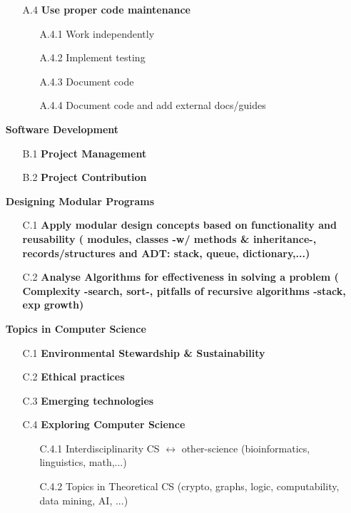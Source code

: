 \documentclass{report}
\begin{document}
\begin{enumerate}
\begin{enumerate}
\begin{enumerate}
		\end{enumerate}
	\item[A.4] {\bf Use proper code maintenance }
		\begin{enumerate}
		\item[A.4.1] Work independently
		\item[A.4.2] Implement testing
		\item[A.4.3] Document code
		\item[A.4.4] Document code and add external docs/guides
		\end{enumerate}
	\end{enumerate}
\item[\xpecB{B.}] {\bf Software Development }
	\begin{enumerate}
	\item[B.1] {\bf Project Management }
	\item[B.2] {\bf Project Contribution }
	\end{enumerate}
\item[\xpecC{C.}] {\bf Designing Modular Programs }
	\begin{enumerate}
	\item[C.1] {\bf Apply modular design concepts based on functionality and reusability ( modules, classes -w/ methods \& inheritance-, records/structures and ADT: stack, queue, dictionary,...) }
	\item[C.2] {\bf Analyse Algorithms for effectiveness in solving a problem ( Complexity -search, sort-, pitfalls of recursive algorithms -stack, exp growth) }
	\end{enumerate}
\item[\xpecD{D.}] {\bf Topics in Computer Science }
	\begin{enumerate}
	\item[C.1] {\bf Environmental Stewardship \& Sustainability }
	\item[C.2] {\bf Ethical practices }
	\item[C.3] {\bf Emerging technologies }
	\item[C.4] {\bf Exploring Computer Science }
		\begin{enumerate}
		\item[C.4.1] Interdisciplinarity CS $\leftrightarrow$ other-science (bioinformatics, linguistics, math,...)
		\item[C.4.2] Topics in Theoretical CS (crypto, graphs, logic, computability, data mining, AI, ...)
		\end{enumerate}
	\end{enumerate}
\end{enumerate}
\end{document}

